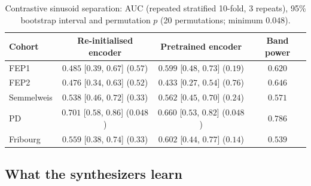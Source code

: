 \begin{table}[!htbp]
    \centering
    \caption{Contrastive sinusoid separation: AUC (repeated stratified 10-fold, 3 repeats), 95\% bootstrap interval and permutation $p$ (20 permutations; minimum $0.048$).}
    \label{tab:contrastive}
    \footnotesize\setlength{\tabcolsep}{4pt}
    \begin{tabular}{@{}l c c c@{}}
        \hline
        \hline
        \hfil Cohort & \hfil Re-initialised encoder & \hfil Pretrained encoder & \hfil Band power \\
        \hline
        FEP1 & $0.485$ [$0.39$, $0.67$] ($0.57$) & $0.599$ [$0.48$, $0.73$] ($0.19$) & $0.620$ \\
        FEP2 & $0.476$ [$0.34$, $0.63$] ($0.52$) & $0.433$ [$0.27$, $0.54$] ($0.76$) & $0.646$ \\
        Semmelweis & $0.538$ [$0.46$, $0.72$] ($0.33$) & $0.562$ [$0.45$, $0.70$] ($0.24$) & $0.571$ \\
        PD & $0.701$ [$0.58$, $0.86$] ($0.048$) & $0.660$ [$0.53$, $0.82$] ($0.048$) & $0.786$ \\
        Fribourg & $0.559$ [$0.38$, $0.74$] ($0.33$) & $0.602$ [$0.44$, $0.77$] ($0.14$) & $0.539$ \\
        \hline
        \hline
    \end{tabular}
\end{table}

\subsection{What the synthesizers learn}\label{section:res_fidelity}

